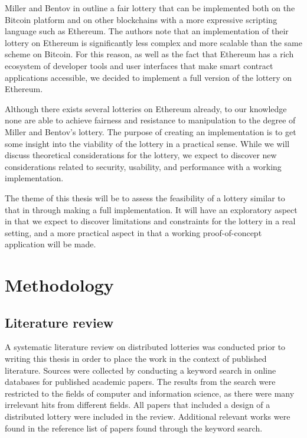 Miller and Bentov in \cite{miller_zero-collateral_2017} outline a fair lottery that can be implemented both on the Bitcoin platform and on other blockchains with a more expressive scripting language such as Ethereum. The authors note that an implementation of their lottery on Ethereum is significantly less complex and more scalable than the same scheme on Bitcoin. For this reason, as well as the fact that Ethereum has a rich ecosystem of developer tools and user interfaces that make smart contract applications accessible, we decided to implement a full version of the lottery on Ethereum. 

Although there exists several lotteries on Ethereum already, to our knowledge none are able to achieve fairness and resistance to manipulation to the degree of Miller and Bentov's lottery. The purpose of creating an implementation is to get some insight into the viability of the lottery in a practical sense. While we will discuss theoretical considerations for the lottery, we expect to discover new considerations related to security, usability, and performance with a working implementation.

The theme of this thesis will be to assess the feasibility of a lottery similar to that in \cite{miller_zero-collateral_2017} through making a full implementation. It will have an exploratory aspect in that we expect to discover limitations and constraints for the lottery in a real setting, and a more practical aspect in that a working proof-of-concept application will be made.

\section{Methodology}
\label{sec:methodology}

\subsection{Literature review}

A systematic literature review on distributed lotteries was conducted prior to writing this thesis in order to place the work in the context of published literature. Sources were collected by conducting a keyword search in online databases for published academic papers. The results from the search were restricted to the fields of computer and information science, as there were many irrelevant hits from different fields. All papers that included a design of a distributed lottery were included in the review. Additional relevant works were found in the reference list of papers found through the keyword search. 

